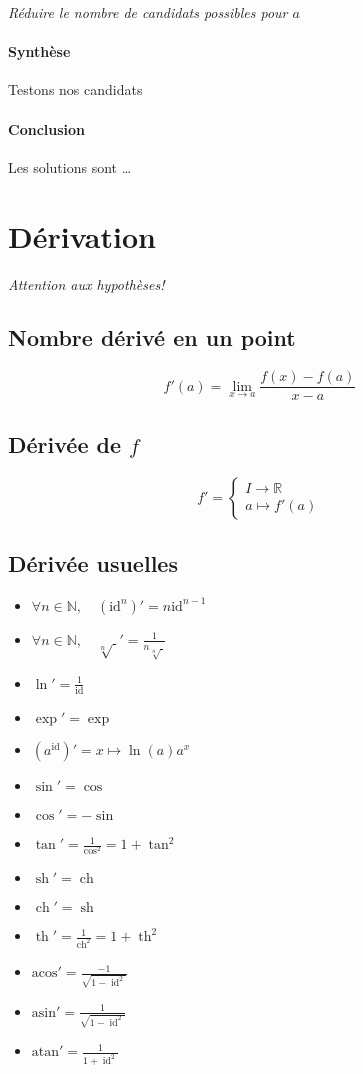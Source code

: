 \documentclass{article}
\newcommand{\R}{{\mathbb R}}
\newcommand{\N}{{\mathbb N}}
\newcommand{\sh}{\operatorname{sh}}
\newcommand{\ch}{\operatorname{ch}}
\renewcommand{\th}{\operatorname{th}}
\newcommand{\id}{\operatorname{id}}
\begin{document}
\emph{Réduire le nombre de candidats possibles pour $a$} 

\paragraph{Synthèse}
Testons nos candidats

\paragraph{Conclusion}
Les solutions sont \ldots

\newpage
\section{Dérivation}
\emph{Attention aux hypothèses!} 
\subsection{Nombre dérivé en un point}
\[
	f'(a) = \lim_{x \to a} \frac{f(x)-f(a)}{x-a}
\] 

\subsection{Dérivée de $f$}
\[
	f' = \begin{cases}
		I\to \R \\
		a \mapsto f'(a)
	\end{cases}
\] 

\subsection{Dérivée usuelles}
\begin{itemize}
	\item $\forall n \in \N,\quad  (\text{id}^n)' = n \text{id}^{n-1}$
	\item $\forall n \in \N,\quad \sqrt[n]{\;}' = \frac{1}{n\sqrt[n]{\;} }  $ 
	\item $\ln' = \frac{1}{\text{id}}$
	\item $\exp'=\exp$
	\item $(a^\text{id})' = x\mapsto \ln(a)a^x$
	\item $ \sin' = \cos $ 
	\item $\cos' = -\sin$
	\item $\tan' = \frac{1}{\cos^2} = 1 + \tan^2$
	\item $ \sh' = \ch $
	\item $ \ch' = \sh$
	\item $\th' = \frac{1}{\ch^2} = 1 + \th^2$
	\item $\text{acos}' = \frac{-1}{\sqrt{1-\id^2} }$
	\item $\text{asin}' = \frac{1}{\sqrt{1-\id^2} }$
	\item $\text{atan}' = \frac{1}{1 + \id^2}$
\end{itemize}
\end{document}
